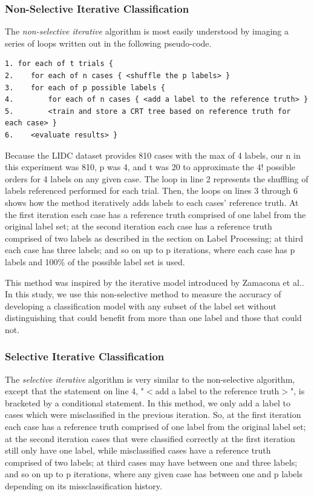 \documentclass[]{spie}
\begin{document}
\subsubsection{Non-Selective Iterative Classification}
The \textit{non-selective iterative} algorithm is most easily understood by imaging a series of loops written out in the following pseudo-code.
\begin{verbatim}
1. for each of t trials {
2.    for each of n cases { <shuffle the p labels> }
3.    for each of p possible labels {
4.        for each of n cases { <add a label to the reference truth> }    
5.        <train and store a CRT tree based on reference truth for each case> }
6.    <evaluate results> }
\end{verbatim}

Because the LIDC dataset provides 810 cases with the max of 4 labels, our n in this experiment was 810, p was 4, and t was 20 to approximate the $4!$ possible orders for 4 labels on any given case. The loop in line 2 represents the shuffling of labels referenced performed for each trial. Then, the loops on lines 3 through 6 shows how the method iteratively adds labels to each cases' reference truth. At the first iteration each case has a reference truth comprised of one label from the original label set; at the second iteration each case has a reference truth comprised of two labels as described in the section on Label Processing; at third each case has three labels; and so on up to p iterations, where each case has p labels and 100\% of the possible label set is used.

This method was inspired by the iterative model introduced by Zamacona et al.\cite{Zamacona13}. In this study, we use this non-selective method to measure the accuracy of developing a classification model with any subset of the label set without distinguishing that could benefit from more than one label and those that could not.

\subsubsection{Selective Iterative Classification}

The \textit{selective iterative} algorithm is very similar to the non-selective algorithm, except that the statement on line 4, "$<$add a label to the reference truth$>$", is bracketed by a conditional statement. In this method, we only add a label to cases which were misclassified in the previous iteration. So, at the first iteration each case has a reference truth comprised of one label from the original label set; at the second iteration cases that were classified correctly at the first iteration still only have one label, while misclassified cases have a reference truth comprised of two labels; at third cases may have between one and three labels; and so on up to p iterations, where any given case has between one and p labels depending on its missclassification history.
\end{document}
